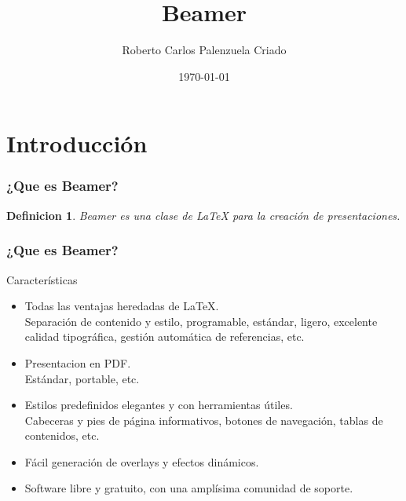 \documentclass{beamer}
\title[Beamer]{Beamer}
\author[cpcroberto]{Roberto Carlos Palenzuela Criado}
\date[\today]{\today}
\newtheorem{definicion}{Definicion}
\begin{document}
  

\begin{frame}
  \titlepage
\end{frame}


\section{Introducción}


\begin{frame}
  \frametitle{¿Que es Beamer?}
  \begin{definicion}
    Beamer es una clase de \LaTeX{} para la creación de presentaciones.
  \end{definicion}
\end{frame}


\begin{frame}
  \frametitle{¿Que es Beamer?}
  \begin{block}{Características}
    \begin{itemize}[<+->]
      \item {\large Todas las ventajas heredadas de \LaTeX{}.} \\
            {\footnotesize Separación de contenido y estilo, programable, estándar,
            ligero, excelente calidad tipográfica, gestión automática de referencias,
            etc.}
      \item {\large Presentacion en PDF.}\\
            {\footnotesize Estándar, portable, etc.}
      \item {\large Estilos predefinidos elegantes y con herramientas útiles.}\\
            {\footnotesize Cabeceras y pies de página informativos, botones de 
            navegación, tablas de contenidos, etc.}
      \item {\large Fácil generación de overlays y efectos dinámicos.}
      \item {\large Software libre y gratuito, con una amplísima comunidad de soporte.}
    \end{itemize}
  \end{block}
\end{frame}
\end{document}
